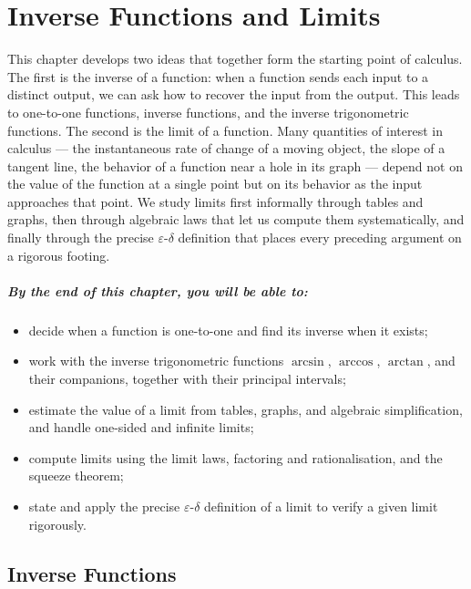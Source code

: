 \chapter{Inverse Functions and Limits}

This chapter develops two ideas that together form the starting point of calculus. The first is the inverse of a function: when a function sends each input to a distinct output, we can ask how to recover the input from the output. This leads to one-to-one functions, inverse functions, and the inverse trigonometric functions. The second is the limit of a function. Many quantities of interest in calculus --- the instantaneous rate of change of a moving object, the slope of a tangent line, the behavior of a function near a hole in its graph --- depend not on the value of the function at a single point but on its behavior as the input approaches that point. We study limits first informally through tables and graphs, then through algebraic laws that let us compute them systematically, and finally through the precise \(\varepsilon\)-\(\delta\) definition that places every preceding argument on a rigorous footing.

\paragraph{By the end of this chapter, you will be able to:}
\begin{itemize}
    \item decide when a function is one-to-one and find its inverse when it exists;
    \item work with the inverse trigonometric functions \(\arcsin\), \(\arccos\), \(\arctan\), and their companions, together with their principal intervals;
    \item estimate the value of a limit from tables, graphs, and algebraic simplification, and handle one-sided and infinite limits;
    \item compute limits using the limit laws, factoring and rationalisation, and the squeeze theorem;
    \item state and apply the precise \(\varepsilon\)-\(\delta\) definition of a limit to verify a given limit rigorously.
\end{itemize}

\section{Inverse Functions}

